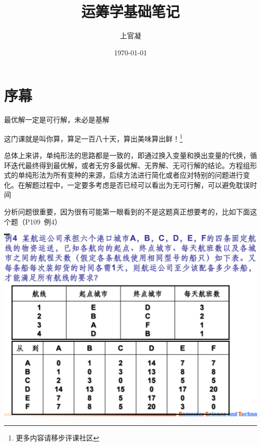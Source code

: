 \documentclass[]{report}
\title{运筹学基础笔记}
\author{上官凝}
\date{\today}
\begin{document}
\theoremstyle{definition} \newtheorem{theorem}{Thm}[section] %
\theoremstyle{definition} \newtheorem{definition}{Def}[section] %
\theoremstyle{plain} \newtheorem{lemma}{lemma}[section] %

	\maketitle
	\newpage

	\tableofcontents
	\newpage

	\section{序幕}
	{\Large{最优解一定是可行解，未必是基解}}\par
	这门课就是叫你算，算足一百八十天，算出美味算出鲜！\footnote{更多内容请移步评课社区}\par
	总体上来讲，单纯形法的思路都是一致的，即通过换入变量和换出变量的代换，循环迭代最终得到最优解，或者无穷多最优解、无界解、无可行解的结论。方程组形式的单纯形法为所有变种的来源，后续方法进行简化或者应对特别的问题进行变化。在解题过程中，一定要多考虑是否已经可以看出为无可行解，可以避免耽误时间\par
	分析问题很重要，因为很有可能第一眼看到的不是这题真正想要考的，比如下面这个题（P109\ 例4）\par
	\includegraphics[scale = 0.3]{pictures/P109_Example4.png}\par
\end{document}
